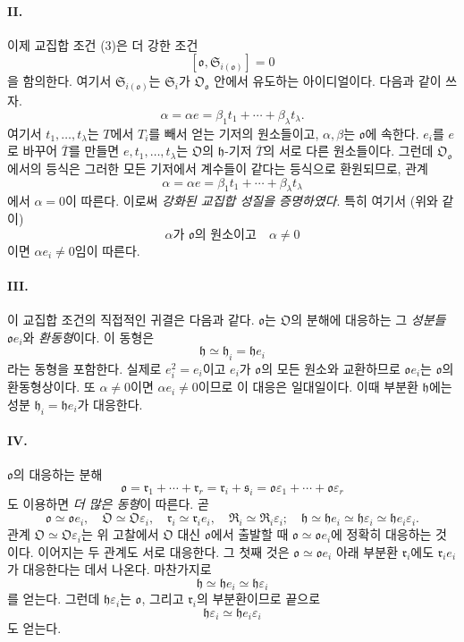 \paragraph{II.}
이제 교집합 조건 (3)은 더 강한 조건
\[
[\mathfrak o,\mathfrak S_{i(\mathfrak o)}]=0
\]
을 함의한다. 여기서 \(\mathfrak S_{i(\mathfrak o)}\)는 \(\mathfrak S_i\)가 \(\mathfrak O_{\mathfrak o}\) 안에서 유도하는 아이디얼이다. 다음과 같이 쓰자.
\[
\alpha=\alpha e=\beta_1t_1+\cdots+\beta_\lambda t_\lambda.
\]
여기서 \(t_1,\ldots,t_\lambda\)는 \(T\)에서 \(T_i\)를 빼서 얻는 기저의 원소들이고, \(\alpha,\beta\)는 \(\mathfrak o\)에 속한다. \(e_i\)를 \(e\)로 바꾸어 \(\overline T\)를 만들면 \(e,t_1,\ldots,t_\lambda\)는 \(\mathfrak O\)의 \(\mathfrak h\)-기저 \(\overline T\)의 서로 다른 원소들이다. 그런데 \(\mathfrak O_{\mathfrak o}\)에서의 등식은 그러한 모든 기저에서 계수들이 같다는 등식으로 환원되므로, 관계
\[
\alpha=\alpha e=\beta_1t_1+\cdots+\beta_\lambda t_\lambda
\]
에서 \(\alpha=0\)이 따른다. 이로써 \emph{강화된 교집합 성질을 증명하였다}. 특히 여기서 (위와 같이)
\[
\alpha\text{가 }\mathfrak o\text{의 원소이고}\quad\alpha\ne0
\]
이면 \(\alpha e_i\ne0\)임이 따른다.

\paragraph{III.}
이 교집합 조건의 직접적인 귀결은 다음과 같다. \(\mathfrak o\)는 \(\mathfrak O\)의 분해에 대응하는 그 \emph{성분들} \(\mathfrak o e_i\)와 \emph{환동형}이다. 이 동형은
\[
\mathfrak h\simeq\mathfrak h_i=\mathfrak h e_i
\]
라는 동형을 포함한다. 실제로 \(e_i^2=e_i\)이고 \(e_i\)가 \(\mathfrak o\)의 모든 원소와 교환하므로 \(\mathfrak o e_i\)는 \(\mathfrak o\)의 환동형상이다. 또 \(\alpha\ne0\)이면 \(\alpha e_i\ne0\)이므로 이 대응은 일대일이다. 이때 부분환 \(\mathfrak h\)에는 성분 \(\mathfrak h_i=\mathfrak h e_i\)가 대응한다.

\paragraph{IV.}
\(\mathfrak o\)의 대응하는 분해
\[
\mathfrak o=\mathfrak r_1+\cdots+\mathfrak r_r
=\mathfrak r_i+\mathfrak s_i
=\mathfrak o\varepsilon_1+\cdots+\mathfrak o\varepsilon_r
\]
도 이용하면 \emph{더 많은 동형}이 따른다. 곧
\[
\mathfrak o\simeq\mathfrak o e_i,
\quad \mathfrak O\simeq\mathfrak O\varepsilon_i,
\quad \mathfrak r_i\simeq\mathfrak r_i e_i,
\quad \mathfrak R_i\simeq\mathfrak R_i\varepsilon_i;
\quad \mathfrak h\simeq\mathfrak h e_i\simeq\mathfrak h\varepsilon_i\simeq\mathfrak h e_i\varepsilon_i.
\]
관계 \(\mathfrak O\simeq\mathfrak O\varepsilon_i\)는 위 고찰에서 \(\mathfrak O\) 대신 \(\mathfrak o\)에서 출발할 때 \(\mathfrak o\simeq\mathfrak o e_i\)에 정확히 대응하는 것이다. 이어지는 두 관계도 서로 대응한다. 그 첫째 것은 \(\mathfrak o\simeq\mathfrak o e_i\) 아래 부분환 \(\mathfrak r_i\)에도 \(\mathfrak r_i e_i\)가 대응한다는 데서 나온다. 마찬가지로
\[
\mathfrak h\simeq\mathfrak h e_i\simeq\mathfrak h\varepsilon_i
\]
를 얻는다. 그런데 \(\mathfrak h\varepsilon_i\)는 \(\mathfrak o\), 그리고 \(\mathfrak r_i\)의 부분환이므로 끝으로
\[
\mathfrak h\varepsilon_i\simeq\mathfrak h e_i\varepsilon_i
\]
도 얻는다.


